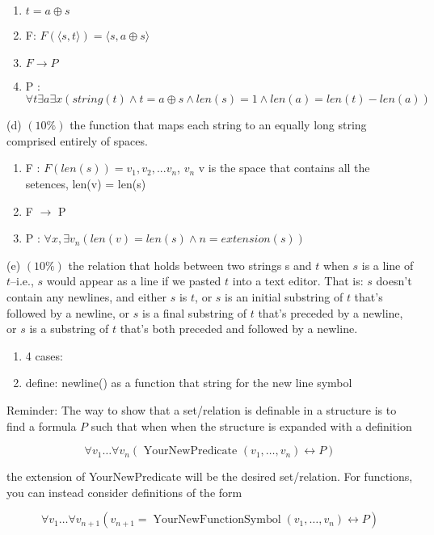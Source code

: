 \documentclass[10pt]{article}
\begin{document}
  \begin{enumerate}
    \item $t = a \oplus s$
    \item F: $F(\langle s, t\rangle) = \langle s, a \oplus s\rangle$
    \item $F \rightarrow P$
    \item P : $\forall t \exists a \exists x (string(t) \land t = a \oplus s \land len(s) = 1 \land len(a) = len(t) - len(a))$
  \end{enumerate}
(d) \((10 \%)\) the function that maps each string to an equally long string comprised entirely of spaces.
\begin{enumerate}
  \item F : $F(len(s)) = v_1, v_2, ... v_n$, $v_{n}$ v is the space that contains all the setences, len(v) = len(s) 
  \item F $\rightarrow$ P 
  \item P : $\forall x, \exists v_n (len(v) = len(s) \land n = extension(s))$
\end{enumerate}
(e) \((10 \%)\) the relation that holds between two strings s and \(t\) when \(s\) is a line of \(t\)--i.e., \(s\) would appear as a line if we pasted \(t\) into a text editor. That is: \(s\) doesn't contain any newlines, and either \(s\) is \(t\), or \(s\) is an initial substring of \(t\) that's followed by a newline, or \(s\) is a final substring of \(t\) that's preceded by a newline, or \(s\) is a substring of \(t\) that's both preceded and followed by a newline.
\begin{enumerate}
  \item 4 cases:  
  \item define: newline() as a function that string for the new line symbol

\end{enumerate}
Reminder: The way to show that a set/relation is definable in a structure is to find a formula \(P\) such that when when the structure is expanded with a definition

\[
\forall v_{1} \ldots \forall v_{n}\left(\text { YourNewPredicate }\left(v_{1}, \ldots, v_{n}\right) \leftrightarrow P\right)
\]

the extension of YourNewPredicate will be the desired set/relation. For functions, you can instead consider definitions of the form

\[
\forall v_{1} \ldots \forall v_{n+1}\left(v_{n+1}=\operatorname{YourNewFunctionSymbol}\left(v_{1}, \ldots, v_{n}\right) \leftrightarrow P\right)
\]
\end{document}
